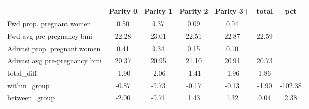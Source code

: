 \begin{tabular}{l*{6}{c}}
\toprule
            &\multicolumn{1}{c}{Parity 0}&\multicolumn{1}{c}{Parity 1}&\multicolumn{1}{c}{Parity 2}&\multicolumn{1}{c}{Parity 3+}&\multicolumn{1}{c}{total}&\multicolumn{1}{c}{pct}\\
\midrule
\midrule
Fwd prop. pregnant women&        0.50&        0.37&        0.09&        0.04&            &            \\
Fwd avg pre-pregnancy bmi&       22.28&       23.01&       22.51&       22.87&       22.59&            \\
Adivasi prop. pregnant women&        0.41&        0.34&        0.15&        0.10&            &            \\
Adivasi avg pre-pregnancy bmi&       20.37&       20.95&       21.10&       20.91&       20.73&            \\
total\_diff  &       -1.90&       -2.06&       -1.41&       -1.96&        1.86&            \\
within\_group&       -0.87&       -0.73&       -0.17&       -0.13&       -1.90&     -102.38\\
between\_group&       -2.00&       -0.71&        1.43&        1.32&        0.04&        2.38\\
\bottomrule
\end{tabular}
